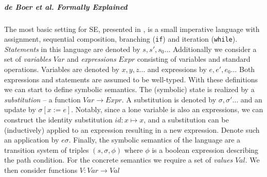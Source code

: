 \documentclass[submission,copyright,creativecommons]{eptcs}
\begin{document}
\subparagraph{de Boer et al. Formally Explained}
The most basic setting for SE, presented in \cite[sec. 2]{boer2021},
is a small imperative language with assignment, sequential composition, branching (\texttt{if})
and iteration (\texttt{while}). \emph{Statements} in this language are denoted by $s, s', s_{0}\ldots$
Additionally we consider a set of \emph{variables} $Var$ and \emph{expressions} $Expr$ consisting of variables and
standard operations. Variables are denoted by $x,y,z\ldots$ and expressions by $e, e', e_{0}\ldots$
Both expressions and statements are assumed to be well-typed.
With these definitions we can start to define symbolic semantics. The (symbolic) state is realized by a
\emph{substitution} -- a function $Var \rightarrow Expr$. A substitution is denoted by $\sigma, \sigma'\ldots$
and an update by $\sigma[x := e]$. Notably, since a lone variable is also an expressions, we can construct the
identity substitution $id : x \mapsto x$, and a substitution can be (inductively) applied to an expression resulting
in a new expression. Denote such an application by $e\sigma$.
Finally, the symbolic semantics of the language are a transition system of triples $(s, \sigma, \phi)$
where $\phi$ is a boolean expression describing the path condition.
For the concrete semantics we require a set of \emph{values} $Val$. We then consider functions $V : Var \rightarrow Val$
\end{document}
